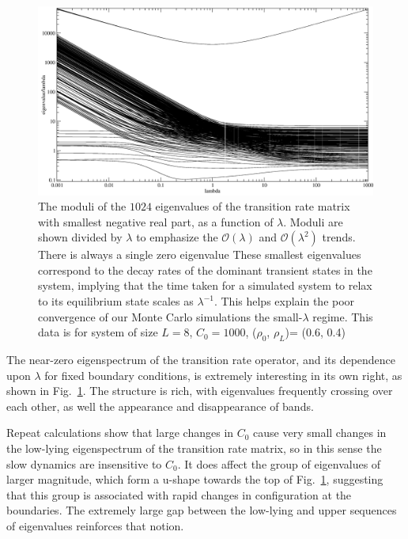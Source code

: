 \documentclass[
reprint, amsmath,amssymb, aps,
 prx,
]{revtex4-1}
\begin{document}
\begin{figure}[h!]
\vspace{0em}
\begin{center}
    \includegraphics[width=1\linewidth]{bigAccSpectrum}
\end{center}
    \vspace{-0em}
\caption{\label{fig:eigenspec} The moduli of the $1024$ eigenvalues of
  the transition rate matrix with smallest negative real part, as a
  function of $\lambda$.
  Moduli are shown divided by $\lambda$ to emphasize the 
  $\mathcal{O}(\lambda)$ and  $\mathcal{O}(\lambda^2)$  trends.
  There is always a single zero eigenvalue These smallest eigenvalues
  correspond to the decay rates of the dominant transient states in
  the system, implying that the time taken for a simulated system to
  relax to its equilibrium state scales as $\lambda^{-1}$. This helps
  explain the poor convergence of our Monte Carlo simulations the
  small-$\lambda$ regime.
  This data is for system of size $L=8$, $C_0=1000$, ($\rho_0$, $\rho_L$)= (0.6, 0.4)
}
\end{figure}

The near-zero eigenspectrum of the transition rate operator, and its
dependence upon $\lambda$ for fixed boundary conditions, is extremely
interesting in its own right, as shown in Fig.~\ref{fig:eigenspec}.
The structure is rich, with eigenvalues frequently crossing over each
other, as well the appearance and disappearance of bands.

Repeat calculations show that large changes in $C_0$ cause very small
changes in the low-lying eigenspectrum of the transition rate matrix,
so in this sense the slow dynamics are insensitive to $C_0$. It does
affect the group of eigenvalues of larger magnitude,
which form a u-shape towards the top of Fig.~\ref{fig:eigenspec},
suggesting that this group is associated with rapid changes in
configuration at the boundaries. The
extremely large gap between the low-lying and upper sequences of
eigenvalues reinforces that notion.  
\end{document}
